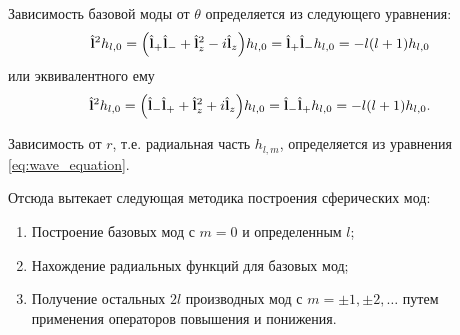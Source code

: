 \documentclass[12pt,a4paper]{article}
\begin{document}

            Зависимость базовой моды от $\theta$ определяется из следующего уравнения:
            \begin{equation}\label{eq:basemode_op_eq}
                \hat{\mathbf{l}}^2 h_{l, 0}
                    = \qty( \hat{\mathbf{l}}_{+} \hat{\mathbf{l}}_{-} + \hat{\mathbf{l}}_z^2 - i \hat{\mathbf{l}}_z ) h_{l, 0}
                    = \hat{\mathbf{l}}_{+} \hat{\mathbf{l}}_{-} h_{l, 0}
                    = - l (l + 1) h_{l, 0}
            \end{equation}
            или эквивалентного ему
            \begin{equation}
                \hat{\mathbf{l}}^2 h_{l, 0}
                    = \qty( \hat{\mathbf{l}}_{-} \hat{\mathbf{l}}_{+} + \hat{\mathbf{l}}_z^2 + i \hat{\mathbf{l}}_z ) h_{l, 0}
                    = \hat{\mathbf{l}}_{-} \hat{\mathbf{l}}_{+} h_{l, 0}
                    = - l (l + 1) h_{l, 0} .
            \end{equation}

            Зависимость от $r$, т.е. радиальная часть $h_{l, m}$, определяется из уравнения \autoref{eq:wave_equation}.

            Отсюда вытекает следующая методика построения сферических мод:
            \begin{enumerate}[noitemsep]
                \item Построение базовых мод с $m = 0$ и определенным $l$;
                \item Нахождение радиальных функций для базовых мод;
                \item Получение остальных $2l$ производных мод с $m = \pm 1, \pm 2, \dots$ путем применения операторов повышения и понижения.
            \end{enumerate}

\end{document}
